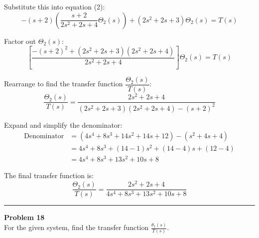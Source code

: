 \documentclass[11pt]{article}
\begin{document}
Substitute this into equation (2):
\[
-(s + 2) \left( \frac{s + 2}{2s^2 + 2s + 4} \Theta_2(s) \right) + (2s^2 + 2s + 3) \Theta_2(s) = T(s)
\]

Factor out $\Theta_2(s)$:
\[
\left[ \frac{-(s + 2)^2 + (2s^2 + 2s + 3)(2s^2 + 2s + 4)}{2s^2 + 2s + 4} \right] \Theta_2(s) = T(s)
\]

Rearrange to find the transfer function $\dfrac{\Theta_2(s)}{T(s)}$:
\[
\frac{\Theta_2(s)}{T(s)} = \frac{2s^2 + 2s + 4}{(2s^2 + 2s + 3)(2s^2 + 2s + 4) - (s + 2)^2}
\]

Expand and simplify the denominator:
\begin{align*}
    \text{Denominator} &= (4s^4 + 8s^3 + 14s^2 + 14s + 12) - (s^2 + 4s + 4) \\
    &= 4s^4 + 8s^3 + (14 - 1)s^2 + (14 - 4)s + (12 - 4) \\
    &= 4s^4 + 8s^3 + 13s^2 + 10s + 8
\end{align*}

The final transfer function is:
\[
\boxed{\frac{\Theta_2(s)}{T(s)} = \frac{2s^2 + 2s + 4}{4s^4 + 8s^3 + 13s^2 + 10s + 8}}
\]


\newpage
  \setcounter{page}{34}  
\noindent\rule{\textwidth}{1pt}
\noindent\textbf{Problem 18} \hfill 
\\ For the given system, find the transfer function $\frac{\theta_1(s)}{T(s)}$.
\end{document}
